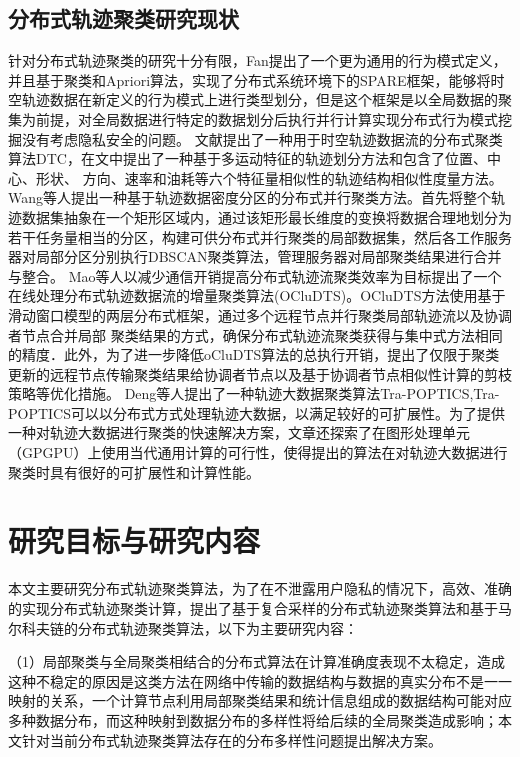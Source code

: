 \subsection{分布式轨迹聚类研究现状}
针对分布式轨迹聚类的研究十分有限，Fan提出了一个更为通用的行为模式定义，并且基于聚类和Apriori算法，实现了分布式系统环境下的SPARE框架，能够将时空轨迹数据在新定义的行为模式上进行类型划分，但是这个框架是以全局数据的聚集为前提，对全局数据进行特定的数据划分后执行并行计算实现分布式行为模式挖掘没有考虑隐私安全的问题。
文献\cite{肖源分布式车辆时空轨迹异常检测算法研究}提出了一种用于时空轨迹数据流的分布式聚类算法DTC，在文中提出了一种基于多运动特征的轨迹划分方法和包含了位置、中心、形状、
方向、速率和油耗等六个特征量相似性的轨迹结构相似性度量方法。
Wang等人提出一种基于轨迹数据密度分区的分布式并行聚类方法。首先将整个轨迹数据集抽象在一个矩形区域内，通过该矩形最长维度的变换将数据合理地划分为若干任务量相当的分区，构建可供分布式并行聚类的局部数据集，然后各工作服务器对局部分区分别执行DBSCAN聚类算法，管理服务器对局部聚类结果进行合并与整合。
Mao等人以减少通信开销提高分布式轨迹流聚类效率为目标提出了一个在线处理分布式轨迹数据流的增量聚类算法(OCluDTS)。OCluDTS方法使用基于滑动窗口模型的两层分布式框架，通过多个远程节点并行聚类局部轨迹流以及协调者节点合并局部
聚类结果的方式，确保分布式轨迹流聚类获得与集中式方法相同的精度．此外，为了进一步降低oCluDTS算法的总执行开销，提出了仅限于聚类更新的远程节点传输聚类结果给协调者节点以及基于协调者节点相似性计算的剪枝策略等优化措施。
Deng等人提出了一种轨迹大数据聚类算法Tra-POPTICS,Tra-POPTICS可以以分布式方式处理轨迹大数据，以满足较好的可扩展性。为了提供一种对轨迹大数据进行聚类的快速解决方案，文章还探索了在图形处理单元（GPGPU）上使用当代通用计算的可行性，使得提出的算法在对轨迹大数据进行聚类时具有很好的可扩展性和计算性能。


\section{研究目标与研究内容}

本文主要研究分布式轨迹聚类算法，为了在不泄露用户隐私的情况下，高效、准确的实现分布式轨迹聚类计算，提出了基于复合采样的分布式轨迹聚类算法和基于马尔科夫链的分布式轨迹聚类算法，以下为主要研究内容：

（1）局部聚类与全局聚类相结合的分布式算法在计算准确度表现不太稳定，造成这种不稳定的原因是这类方法在网络中传输的数据结构与数据的真实分布不是一一映射的关系，一个计算节点利用局部聚类结果和统计信息组成的数据结构可能对应多种数据分布，而这种映射到数据分布的多样性将给后续的全局聚类造成影响；本文针对当前分布式轨迹聚类算法存在的分布多样性问题提出解决方案。

